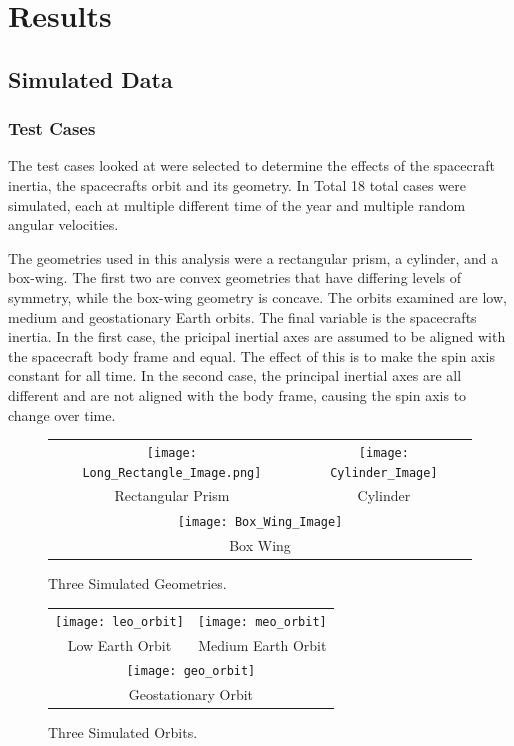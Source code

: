 \chapter{Results}

\section{Simulated Data}

\subsection{Test Cases}

The test cases looked at were selected to determine the effects of the spacecraft inertia, the spacecrafts orbit and its geometry. In Total 18 total cases were simulated, each at multiple different time of the year and multiple random angular velocities.

The geometries used in this analysis were a rectangular prism, a cylinder, and a box-wing. The first two are convex geometries that have differing levels of symmetry, while the box-wing geometry is concave. The orbits examined are low, medium and geostationary Earth orbits. The final variable is the spacecrafts inertia. In the first case, the pricipal inertial axes are assumed to be aligned with the spacecraft body frame and equal. The effect of this is to make the spin axis constant for all time. In the second case, the principal inertial axes are all different and are not aligned with the body frame, causing the spin axis to change over time.

\begin{figure}
	\begin{tabular}{cc}
		\texttt{[image: Long\_Rectangle\_Image.png]} &
		\texttt{[image: Cylinder\_Image]} \\
		Rectangular Prism & Cylinder \\
		\multicolumn{2}{c}{\texttt{[image: Box\_Wing\_Image]}} \\
		\multicolumn{2}{c}{Box Wing}
	\end{tabular}
	\caption{Three Simulated Geometries.}
\end{figure}


\begin{figure}
	\begin{tabular}{cc}
		\texttt{[image: leo\_orbit]} &
		\texttt{[image: meo\_orbit]} \\
		Low Earth Orbit & Medium Earth Orbit \\
		\multicolumn{2}{c}{\texttt{[image: geo\_orbit]}} \\
		\multicolumn{2}{c}{Geostationary Orbit}
	\end{tabular}
	\caption{Three Simulated Orbits.}
\end{figure}

